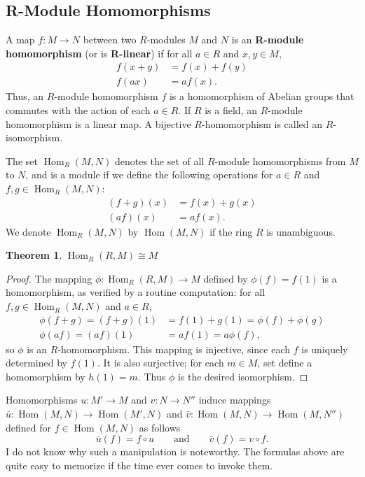 \documentclass[11pt]{article}
\newtheorem{theorem}{Theorem}
\newcommand{\Hom}{\operatorname{Hom}}
\begin{document}

\subsection{R-Module Homomorphisms}

A map $f: M \to N$ between two $R$-modules $M$ and $N$ is an \textbf{R-module homomorphism} (or is \textbf{R-linear}) if for all $a \in R$ and $x, y \in M$,
\begin{align*}
	f(x + y) & = f(x) + f(y) \\
	f(ax)    & = a f(x).
\end{align*}
Thus, an $R$-module homomorphism $f$ is a homomorphism of Abelian groups that commutes with the action of each $a \in R$. If $R$ is a field, an $R$-module homomorphism is a linear map. A bijective $R$-homomorphism is called an $R$-isomorphism.

The set $\Hom_{R}(M, N)$ denotes the set of all $R$-module homomorphisms from $M$ to $N$, and is a module if we define the following operations for $a \in R$ and $f, g \in \Hom_{R}(M, N)$:
  \begin{align*}
	(f + g)(x) & = f(x) + g(x) \\
	(af)(x)    & = a f(x).
\end{align*}
We denote $\Hom_{R}(M, N)$ by $\Hom(M, N)$ if the ring $R$ is unambiguous.

\begin{adjustwidth}{0.5cm}{}
	\begin{theorem}
		$\Hom_{R}(R, M) \cong M$
	\end{theorem}
	\begin{proof}
		The mapping $\phi : \Hom_{R}(R, M) \to M$ defined by $\phi(f) = f(1)$ is a homomorphism, as verified by a routine computation: for all $f, g \in \Hom_{R}(M, N)$ and $a \in R$,
		\begin{align*}
      \phi(f + g) = (f + g)(1) &= f(1) + g(1) = \phi(f) + \phi(g) \\
            \phi(af) = (af)(1) &= a f(1) = a \phi(f),
		\end{align*}
		so $\phi$ is an $R$-homomorphism. This mapping is injective, since each $f$ is uniquely determined by $f(1)$. It is also surjective; for each $m \in M$, set define a homomorphism by $h(1) = m$. Thus $\phi$ is the desired isomorphism.
	\end{proof}
\end{adjustwidth}

Homomorphisms $u : M' \to M$ and $v : N \to N''$ induce mappings $\bar{u} : \Hom(M, N) \to \Hom(M', N)$ and $\bar{v} : \Hom(M, N) \to \Hom(M, N'')$ defined for $f \in \Hom(M, N)$ as follows
\[
	\bar{u}(f) = f \circ u \qquad \text{and} \qquad \bar{v}(f) = v \circ f.
\]
I do not know why such a manipulation is noteworthy. The formulas above are quite easy to memorize if the time ever comes to invoke them.
\end{document}
